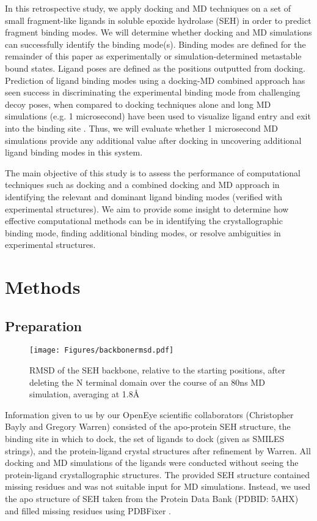 \documentclass[journal=jcisd8,manuscript=article]{achemso}
\begin{document}
In this retrospective study, we apply docking and MD techniques on a set of small fragment-like ligands in soluble epoxide hydrolase (SEH) in order to predict fragment binding modes.
We will determine whether docking and MD simulations can successfully identify the binding mode(s).
Binding modes are defined for the remainder of this paper as experimentally or simulation-determined metastable bound states.
Ligand poses are defined as the positions outputted from docking.
Prediction of ligand binding modes using a docking-MD combined approach has seen success in discriminating the experimental binding mode from challenging decoy poses, when compared to docking techniques alone \cite{liu_exploring_2017,clark_prediction_2016} and long MD simulations (e.g. 1 microsecond) have been used to visualize ligand entry and exit into the binding site \cite{decherchi_ligand_2015}.
Thus, we will evaluate whether 1 microsecond MD simulations provide any additional value after docking in uncovering additional ligand binding modes in this system.

The main objective of this study is to assess the performance of computational techniques such as docking and a combined docking and MD approach in identifying the relevant and dominant ligand binding modes (verified with experimental structures).
We aim to provide some insight to determine how effective computational methods can be in identifying the crystallographic binding mode, finding additional binding modes, or resolve ambiguities in experimental structures.

\section{Methods}

\subsection{Preparation}

\begin{figure}
    \centering
    \texttt{[image: Figures/backbonermsd.pdf]}
    \caption{RMSD of the SEH backbone, relative to the starting positions, after deleting the N terminal domain over the course of an 80ns MD simulation, averaging at 1.8{\AA}}
    \label{fig:backbonermsd}
\end{figure}
Information given to us by our OpenEye scientific collaborators (Christopher Bayly and Gregory Warren) consisted of the apo-protein SEH structure, the binding site in which to dock, the set of ligands to dock (given as SMILES strings), and the protein-ligand crystal structures after refinement by Warren.
All docking and MD simulations of the ligands were conducted without seeing the protein-ligand crystallographic structures.
The provided SEH structure contained missing residues and was not suitable input for MD simulations.
Instead, we used the apo structure of SEH taken from the Protein Data Bank (PDBID: 5AHX) and filled missing residues using PDBFixer \cite{noauthor_pdbfixer_2019}.
\end{document}

